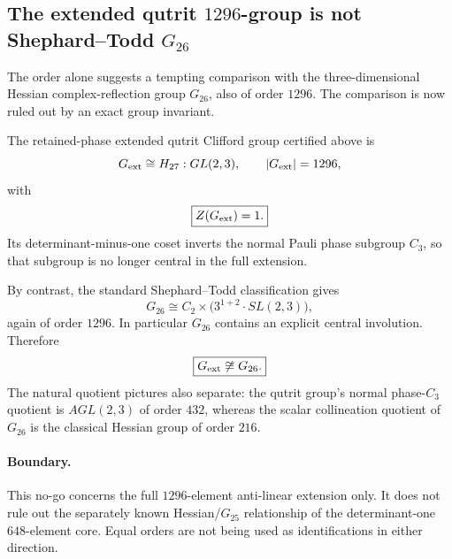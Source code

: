 \subsection*{The extended qutrit \(1296\)-group is not Shephard--Todd \(G_{26}\)}

The order alone suggests a tempting comparison with the three-dimensional
Hessian complex-reflection group \(G_{26}\), also of order \(1296\).  The
comparison is now ruled out by an exact group invariant.

The retained-phase extended qutrit Clifford group certified above is
\[
G_{\rm ext}\cong H_{27}:GL(2,3),
\qquad |G_{\rm ext}|=1296,
\]
with
\[
\boxed{Z(G_{\rm ext})=1.}
\]
Its determinant-minus-one coset inverts the normal Pauli phase subgroup
\(C_3\), so that subgroup is no longer central in the full extension.

By contrast, the standard Shephard--Todd classification gives
\[
\boxed{
G_{26}\cong C_2\times\bigl(3^{1+2}\!\cdot SL(2,3)\bigr),
}
\]
again of order \(1296\).  In particular \(G_{26}\) contains an explicit
central involution. Therefore
\[
\boxed{
G_{\rm ext}\not\cong G_{26}.
}
\]
The natural quotient pictures also separate: the qutrit group's normal
phase-\(C_3\) quotient is \(AGL(2,3)\) of order \(432\), whereas the scalar
collineation quotient of \(G_{26}\) is the classical Hessian group of order
\(216\).

\paragraph{Boundary.}
This no-go concerns the full \(1296\)-element anti-linear extension only.
It does not rule out the separately known Hessian/\(G_{25}\) relationship of
the determinant-one \(648\)-element core.  Equal orders are not being used
as identifications in either direction.

